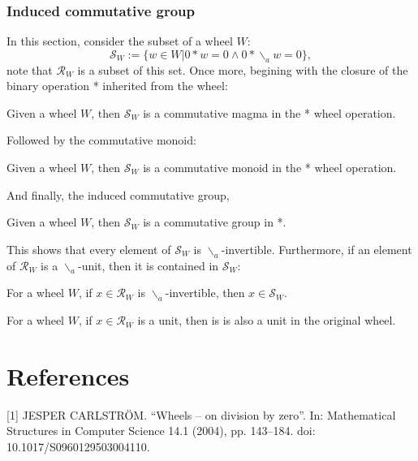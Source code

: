 \subsection{Induced commutative group}
In this section, consider the subset of a wheel $W$:
\[
  \mathcal{S}_{W} := \{ w \in W | 0*w = 0 \wedge 0*\backslash_{a}w = 0 \},
\]
note that $\mathcal{R}_{W}$ is a subset of this set. Once more, begining with the closure of the binary operation *
inherited from the wheel:
\begin{definition}
  \leanok
  Given a wheel $W$, then $\mathcal{S}_{W}$ is a commutative magma in the * wheel operation.
\end{definition}
Followed by the commutative monoid:
\begin{definition}
  \leanok
  Given a wheel $W$, then $\mathcal{S}_{W}$ is a commutative monoid in the * wheel operation.
\end{definition}
And finally, the induced commutative group,
\begin{definition}
  \leanok
  Given a wheel $W$, then $\mathcal{S}_{W}$ is a commutative group in *.
\end{definition}
This shows that every element of $\mathcal{S}_{W}$ is $\backslash_{a}$-invertible. Furthermore, if an element of $\mathcal{R}_{W}$ 
is a $\backslash_{a}$-unit, then it is contained in $\mathcal{S}_{W}$:
\begin{proposition}
  \leanok
  For a wheel $W$, if $x \in \mathcal{R}_{W}$ is $\backslash_{a}$-invertible, then $x \in \mathcal{S}_{W}$.
\end{proposition}
\begin{proposition}
  \leanok
  For a wheel $W$, if $x \in \mathcal{R}_{W}$ is a unit, then is is also a unit in the original wheel.
\end{proposition}
\chapter{References}
[1] JESPER CARLSTRÖM. “Wheels – on division by zero”. In: Mathematical Structures in Computer Science 14.1 (2004), pp. 143–184. doi: 10.1017/S0960129503004110.